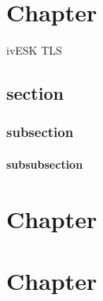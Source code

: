 {}%
{\mainmatter}%


\chapter{Chapter}
\lipsum \ac{ivESK} \ac{TLS}
\section{section}
\lipsum
\subsection{subsection}
\lipsum
\subsubsection{subsubsection}
\lipsum
\chapter{Chapter}
\lipsum
\chapter{Chapter}
\lipsum


\printbibliography

\appendix
{}

%	
